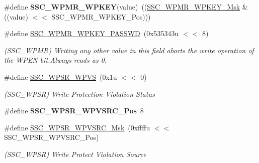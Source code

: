 \begin{DoxyCompactItemize}
\#define {\bfseries S\+S\+C\+\_\+\+W\+P\+M\+R\+\_\+\+W\+P\+K\+EY}(value)~((\mbox{\hyperlink{group__SAMV71__SSC_ga7be187a275ddfe23b8a1858da272aacc}{S\+S\+C\+\_\+\+W\+P\+M\+R\+\_\+\+W\+P\+K\+E\+Y\+\_\+\+Msk}} \& ((value) $<$$<$ S\+S\+C\+\_\+\+W\+P\+M\+R\+\_\+\+W\+P\+K\+E\+Y\+\_\+\+Pos)))
\item 
\mbox{\label{group__SAMV71__SSC_ga4bac2da515b27c22389630b3e99a9f78}} 
\#define \mbox{\hyperlink{group__SAMV71__SSC_ga4bac2da515b27c22389630b3e99a9f78}{S\+S\+C\+\_\+\+W\+P\+M\+R\+\_\+\+W\+P\+K\+E\+Y\+\_\+\+P\+A\+S\+S\+WD}}~(0x535343u $<$$<$ 8)
\begin{DoxyCompactList}\small\item\em (S\+S\+C\+\_\+\+W\+P\+MR) Writing any other value in this field aborts the write operation of the W\+P\+EN bit.\+Always reads as 0. \end{DoxyCompactList}\item 
\mbox{\label{group__SAMV71__SSC_ga842b1f6249a5c171786a2ae3881db56c}} 
\#define \mbox{\hyperlink{group__SAMV71__SSC_ga842b1f6249a5c171786a2ae3881db56c}{S\+S\+C\+\_\+\+W\+P\+S\+R\+\_\+\+W\+P\+VS}}~(0x1u $<$$<$ 0)
\begin{DoxyCompactList}\small\item\em (S\+S\+C\+\_\+\+W\+P\+SR) Write Protection Violation Status \end{DoxyCompactList}\item 
\mbox{\label{group__SAMV71__SSC_ga1c4da89fbe8aa1d737f1f41bec925bdb}} 
\#define {\bfseries S\+S\+C\+\_\+\+W\+P\+S\+R\+\_\+\+W\+P\+V\+S\+R\+C\+\_\+\+Pos}~8
\item 
\mbox{\label{group__SAMV71__SSC_ga6dbf65973e943e7e2653cc10687ae629}} 
\#define \mbox{\hyperlink{group__SAMV71__SSC_ga6dbf65973e943e7e2653cc10687ae629}{S\+S\+C\+\_\+\+W\+P\+S\+R\+\_\+\+W\+P\+V\+S\+R\+C\+\_\+\+Msk}}~(0xffffu $<$$<$ S\+S\+C\+\_\+\+W\+P\+S\+R\+\_\+\+W\+P\+V\+S\+R\+C\+\_\+\+Pos)
\begin{DoxyCompactList}\small\item\em (S\+S\+C\+\_\+\+W\+P\+SR) Write Protect Violation Source \end{DoxyCompactList}\item 
\mbox{\label{group__SAMV71__SSC_ga0a626a46ed97942c9cb288c1ccd9c9bb}} 

\end{DoxyCompactItemize}
